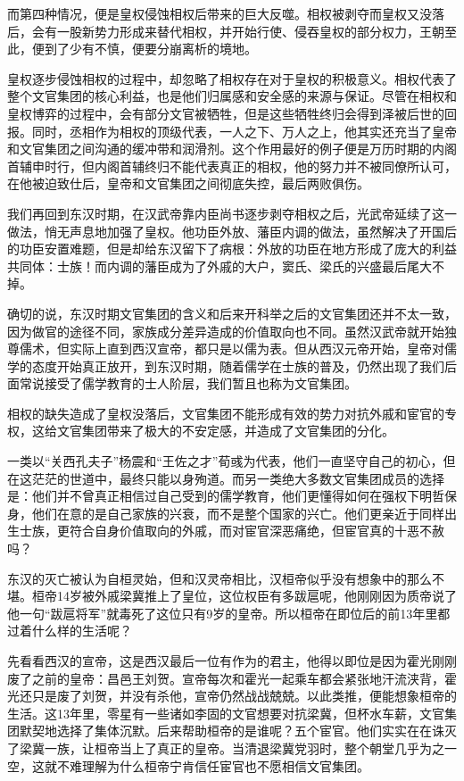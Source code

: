 \documentclass[]{book}
\begin{document}
而第四种情况，便是皇权侵蚀相权后带来的巨大反噬。相权被剥夺而皇权又没落后，会有一股新势力形成来替代相权，并开始行使、侵吞皇权的部分权力，王朝至此，便到了少有不慎，便要分崩离析的境地。

皇权逐步侵蚀相权的过程中，却忽略了相权存在对于皇权的积极意义。相权代表了整个文官集团的核心利益，也是他们归属感和安全感的来源与保证。尽管在相权和皇权博弈的过程中，会有部分文官被牺牲，但是这些牺牲终归会得到泽被后世的回报。同时，丞相作为相权的顶级代表，一人之下、万人之上，他其实还充当了皇帝和文官集团之间沟通的缓冲带和润滑剂。这个作用最好的例子便是万历时期的内阁首辅申时行，但内阁首辅终归不能代表真正的相权，他的努力并不被同僚所认可，在他被迫致仕后，皇帝和文官集团之间彻底失控，最后两败俱伤。

我们再回到东汉时期，在汉武帝靠内臣尚书逐步剥夺相权之后，光武帝延续了这一做法，悄无声息地加强了皇权。他功臣外放、藩臣内调的做法，虽然解决了开国后的功臣安置难题，但是却给东汉留下了病根：外放的功臣在地方形成了庞大的利益共同体：士族！而内调的藩臣成为了外戚的大户，窦氏、梁氏的兴盛最后尾大不掉。

确切的说，东汉时期文官集团的含义和后来开科举之后的文官集团还并不太一致，因为做官的途径不同，家族成分差异造成的价值取向也不同。虽然汉武帝就开始独尊儒术，但实际上直到西汉宣帝，都只是以儒为表。但从西汉元帝开始，皇帝对儒学的态度开始真正放开，到东汉时期，随着儒学在士族的普及，仍然出现了我们后面常说接受了儒学教育的士人阶层，我们暂且也称为文官集团。

相权的缺失造成了皇权没落后，文官集团不能形成有效的势力对抗外戚和宦官的专权，这给文官集团带来了极大的不安定感，并造成了文官集团的分化。

一类以``关西孔夫子''杨震和``王佐之才''荀彧为代表，他们一直坚守自己的初心，但在这茫茫的世道中，最终只能以身殉道。而另一类绝大多数文官集团成员的选择是：他们并不曾真正相信过自己受到的儒学教育，他们更懂得如何在强权下明哲保身，他们在意的是自己家族的兴衰，而不是整个国家的兴亡。他们更亲近于同样出生士族，更符合自身价值取向的外戚，而对宦官深恶痛绝，但宦官真的十恶不赦吗？

东汉的灭亡被认为自桓灵始，但和汉灵帝相比，汉桓帝似乎没有想象中的那么不堪。桓帝14岁被外戚梁冀推上了皇位，这位权臣有多跋扈呢，他刚刚因为质帝说了他一句``跋扈将军''就毒死了这位只有9岁的皇帝。所以桓帝在即位后的前13年里都过着什么样的生活呢？

先看看西汉的宣帝，这是西汉最后一位有作为的君主，他得以即位是因为霍光刚刚废了之前的皇帝：昌邑王刘贺。宣帝每次和霍光一起乘车都会紧张地汗流浃背，霍光还只是废了刘贺，并没有杀他，宣帝仍然战战兢兢。以此类推，便能想象桓帝的生活。这13年里，零星有一些诸如李固的文官想要对抗梁冀，但杯水车薪，文官集团默契地选择了集体沉默。后来帮助桓帝的是谁呢？五个宦官。他们实实在在诛灭了梁冀一族，让桓帝当上了真正的皇帝。当清退梁冀党羽时，整个朝堂几乎为之一空，这就不难理解为什么桓帝宁肯信任宦官也不愿相信文官集团。
\end{document}
